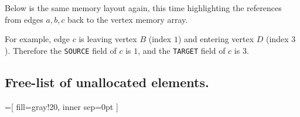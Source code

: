 Below is the same memory layout again, this time highlighting the references from edges $a, b, c$ back to the vertex memory array.
\begin{center}
\end{center}
For example, edge $c$ is leaving vertex $B$ (index $1$) and entering vertex $D$ (index $3$).
Therefore the \texttt{SOURCE} field of $c$ is $1$, and the \texttt{TARGET} field of $c$ is $3$.





\subsection{Free-list of unallocated elements.}

=[
		fill=gray!20,
		inner sep=0pt
	]

\newcommand{\freespot}[2]{
  \matrix (s) at (s.south west) [spot matrix]
  {
    \node (s#2c1) {$\mathbf{-2}$}; \\
    \node (s#2c2) {#1}; \\
    \node (s#2c3) [minimum height=13.5mm] {}; \\
  };
	\node at (s#2c1.west) [text width=3mm, draw=none, xshift=-1mm, text=blue, font=\scriptsize] {#2};
	\begin{pgfonlayer}{background}
  	\node [free bg, fit=(s#2c1)(s#2c3)] {};
  \end{pgfonlayer}
}

